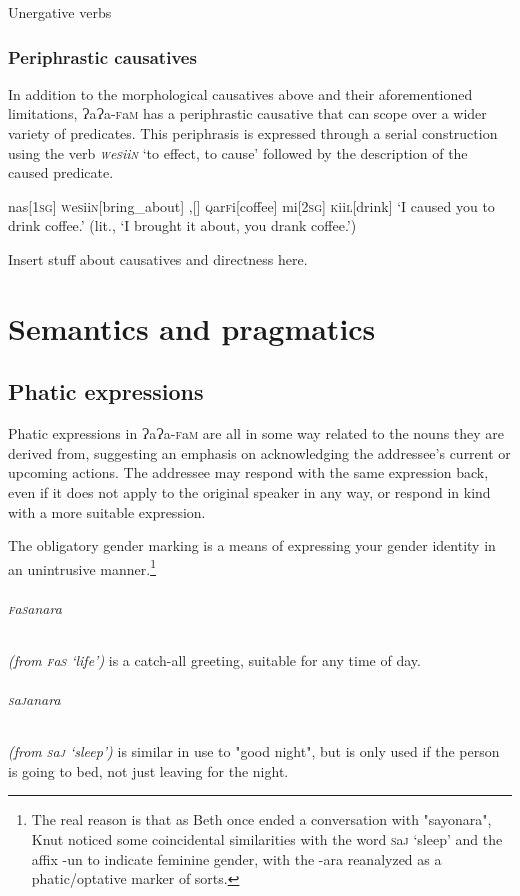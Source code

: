 \documentclass[a4paper,10pt,twoside,openright]{memoir}
\newcommand{\lang}{ɁaɁa-\textsc{f}a\textsc{m}}
\newcommand{\famword}[5]{#1\textsc{#2}#3\textsc{#4}#5}
\begin{document}
Unergative verbs

\subsection{Periphrastic causatives}

In addition to the morphological causatives above and their aforementioned limitations, \lang{} has a periphrastic causative that can scope over a wider variety of predicates. This periphrasis is expressed through a serial construction using the verb \textit{\textsc{w}\famword{e}{s}{ii}{n}{}} `to effect, to cause' followed by the description of the caused predicate. 

\ex
\begingl
nas[\textsc{1sg}]
\textsc{w}\famword{e}{s}{ii}{n}{}[bring\_about]
,[]
\famword{}{q}{ar}{f}{i}[coffee]
mi[\textsc{2sg}]
\famword{}{k}{ii}{l}{}[drink]
\glft `I caused you to drink coffee.' (lit., `I brought it about, you drank coffee.')
\endgl
\xe

Insert stuff about causatives and directness here.

\chapter{Semantics and pragmatics}
\section{Phatic expressions}

Phatic expressions in \lang{} are all in some way related to the nouns they are derived from, suggesting an emphasis on acknowledging the addressee's current or upcoming actions. The addressee may respond with the same expression back, even if it does not apply to the original speaker in any way, or respond in kind with a more suitable expression.

The obligatory gender marking is a means of expressing your gender identity in an unintrusive manner.\footnote{The real reason is that as Beth once ended a conversation with "sayonara", Knut noticed some coincidental similarities with the word \famword{}{s}{a}{j}{} `sleep' and the affix -un to indicate feminine gender, with the -ara reanalyzed as a phatic/optative marker of sorts.}

\subparagraph{\famword{}{f}{a}{s}{anara}} \textit{(from \famword{}{f}{a}{s}{} `life')} is a catch-all greeting, suitable for any time of day. 

\subparagraph{\famword{}{s}{a}{j}{anara}} \textit{(from \famword{}{s}{a}{j}{} `sleep')} is similar in use to "good night", but is only used if the person is going to bed, not just leaving for the night.
\end{document}

